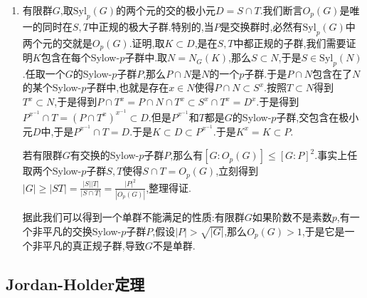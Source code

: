 \begin{enumerate}
\begin{proof}
		不妨设$n_p>1$,于是得到$n_p=q$.现在取两个不同的Sylow-$p$子群$S,T$,使得$|S\cap T|$的阶数是最大的,记这时$D=S\cap T$.如果$D=1$,那么任意两个不同的Sylow-$p$子群的交是平凡的,这导致全部阶数为$p$次幂的非幺元的元的个数为$q(p^a-1)$.于是阶数不是$p$正整数次幂的元的个数是$q$.这导致Sylow-$q$子群恰好有一个,于是群不是单群.
		
		现在假设$|D|>1$,取$N=N_G(D)$,按照$p$群上一个真子群的正规化子严格包含这个真子群,有$N\cap S$真包含$D$,$N\cap T$也真包含$D$.
		
		现在我们断言$N$不是$p$群,否则它包含在某个Sylow-$p$群$R$中,但是$R\cap S\supset N\cap S$是真包含$D$的,这和$D$的极大性矛盾.这就导致$q$整除$|N|$,于是如果取$Q\in\mathrm{Syl}_q(N)$,得到$|Q|=q$,那么$S\cap Q=1$,结合$|SQ|=|G| $,得到$SQ=G$.于是对任意的$g\in G$,可以写作$g=xy$,其中$x\in S,y\in Q$.那么得到$S^g=S^{xy}=S^y\supset D^y=D$,其中最后一个等式是因为$y\in Q\subset N=N_G(D)$.于是$D$包含在$G$中$S$的每个共轭类上中.于是$D\subset O_p(G)$.这导致$O_p(G)$是非平凡的真正规子群,于是$G$仍然不是单群.
	\end{proof}
	\item 有限群$G$,取$\mathrm{Syl}_p(G)$的两个元的交的极小元$D=S\cap T$.我们断言$O_p(G)$是唯一的同时在$S,T$中正规的极大子群.特别的,当$P$是交换群时,必然有$\mathrm{Syl}_p(G)$中两个元的交就是$O_p(G)$.证明,取$K\subset D$,是在$S,T$中都正规的子群,我们需要证明$K$包含在每个Sylow-$p$子群中.取$N=N_G(K)$,那么$S\subset N$,于是$S\in\mathrm{Syl}_p(N)$.任取一个$G$的Sylow-$p$子群$P$,那么$P\cap N$是$N$的一个$p$子群.于是$P\cap N$包含在了$N$的某个Sylow-$p$子群中,也就是存在$x\in N$使得$P\cap N\subset S^x$.按照$T\subset N$得到$T^x\subset N$,于是得到$P\cap T^x=P\cap N\cap T^x\subset S^x\cap T^x=D^x$.于是得到$P^{x^{-1}}\cap T=(P\cap T^x)^{x^{-1}}\subset D$.但是$P^{x^{-1}}$和$T$都是$G$的Sylow-$p$子群,交包含在极小元$D$中,于是$P^{x^{-1}}\cap T=D$.于是$K\subset D\subset P^{x^{-1}}$.于是$K^x=K\subset P$.
	
	若有限群$G$有交换的Sylow-$p$子群$P$,那么有$[G:O_p(G)]\le[G:P]^2$.事实上任取两个Sylow-$p$子群$S,T$使得$S\cap T=O_p(G)$,立刻得到$|G|\ge|ST|=\frac{|S||T|}{|S\cap T|}=\frac{|P|^2}{|O_p(G)|}$,整理得证.
	
	据此我们可以得到一个单群不能满足的性质:有限群$G$如果阶数不是素数$p$,有一个非平凡的交换Sylow-$p$子群$P$,假设$|P|>\sqrt{|G|}$,那么$O_p(G)>1$,于是它是一个非平凡的真正规子群,导致$G$不是单群.
\end{enumerate}
\newpage
\subsection{Jordan-Holder定理}

